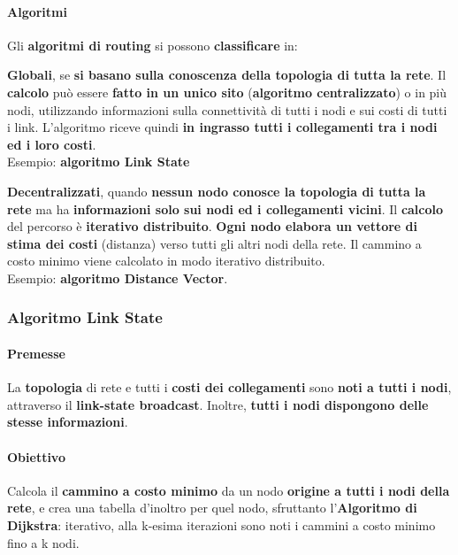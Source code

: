 \documentclass[10pt]{article}
\begin{document}
\paragraph{Algoritmi} Gli \textbf{algoritmi di routing} si possono \textbf{classificare} in:
\begin{list}{}{}
\item \textbf{Globali}, se \textbf{si basano sulla conoscenza della topologia di tutta la rete}. Il \textbf{calcolo} può essere \textbf{fatto in un unico sito} (\textbf{algoritmo centralizzato}) o in più nodi, utilizzando informazioni sulla connettività di tutti i nodi e sui costi di tutti i link. L'algoritmo riceve quindi \textbf{in ingrasso tutti i collegamenti tra i nodi ed i loro costi}.\\Esempio: \textbf{algoritmo Link State}
\item \textbf{Decentralizzati}, quando \textbf{nessun nodo conosce la topologia di tutta la rete} ma ha \textbf{informazioni solo sui nodi ed i collegamenti vicini}. Il \textbf{calcolo} del percorso è \textbf{iterativo distribuito}. \textbf{Ogni nodo elabora un vettore di stima dei costi} (distanza) verso tutti gli altri nodi della rete. Il cammino a costo minimo viene calcolato in modo iterativo distribuito.\\Esempio: \textbf{algoritmo Distance Vector}.
\end{list}
\pagebreak
\subsubsection{Algoritmo Link State}
\paragraph{Premesse} La \textbf{topologia} di rete e tutti i \textbf{costi dei collegamenti} sono \textbf{noti a tutti i nodi}, attraverso il \textbf{link-state broadcast}. Inoltre, \textbf{tutti i nodi dispongono delle stesse informazioni}.
\paragraph{Obiettivo} Calcola il \textbf{cammino a costo minimo} da un nodo \textbf{origine a tutti i nodi della rete}, e crea una tabella d'inoltro per quel nodo, sfruttanto l'\textbf{Algoritmo di Dijkstra}: iterativo, alla k-esima iterazioni sono noti i cammini a costo minimo fino a k nodi.
\end{document}
